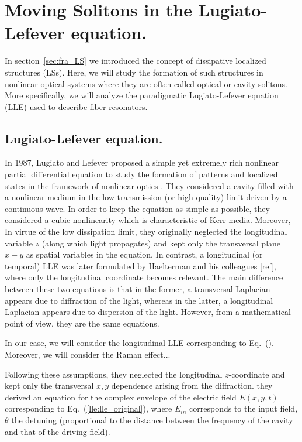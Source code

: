 \chapter{Moving Solitons in the Lugiato-Lefever equation.}

In section~\ref{sec:fra_LS} we introduced the concept of dissipative localized structures (LSs). Here, we will study the formation
of such structures in nonlinear optical systems where they are often called optical or cavity solitons. 
More specifically, we will analyze the paradigmatic Lugiato-Lefever equation (LLE) \cite{lugiatolefever1987} used to describe fiber resonators.

\section{Lugiato-Lefever equation.}

In 1987, Lugiato and Lefever proposed a simple yet extremely rich nonlinear partial differential equation to study the formation of patterns and localized states
in the framework of nonlinear optics \cite{lugiatolefever1987}. They considered a cavity filled with a nonlinear medium in the low transmission (or high quality) limit
driven by a continuous wave. In order to keep the equation as simple as possible, they considered a cubic nonlinearity which is characteristic of Kerr media. Moreover,
In virtue
of the low dissipation limit, they originally neglected the longitudinal variable $z$ (along which light propagates) and kept only the transversal plane $x-y$ as spatial
variables in the equation. In contrast, a longitudinal (or temporal) LLE was later formulated by Haelterman and his colleagues [ref], where only the longitudinal 
coordinate becomes relevant. The main difference between these two equations is that in the former, a transversal Laplacian appears due to diffraction of the light, whereas
in the latter, a longitudinal Laplacian appears due to dispersion of the light. However, from a mathematical point of view, they are the same equations.

In our case, we will consider the longitudinal LLE corresponding to Eq.~(). Moreover, we will consider the Raman effect... 



Following
these assumptions, they neglected the longitudinal $z$-coordinate and kept only the transversal $x,y$ dependence arising from the diffraction.  
they derived an equation for the complex envelope of the electric field $E(x, y, t)$ corresponding to Eq.~(\ref{lle:lle_original}),
where $E_{in}$ corresponds to the input field, $\theta$ the detuning (proportional to the distance between the frequency of the cavity and that of the driving field).

